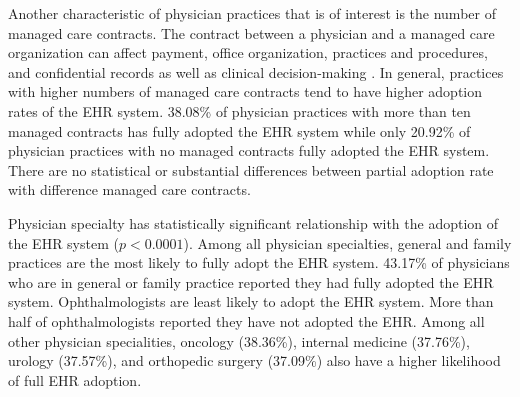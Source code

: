 \documentclass[12pt]{report}
\begin{document}
Another characteristic of physician practices that is of interest is the number of managed care contracts. The contract between a physician and a managed care organization can affect payment, office organization, practices and procedures, and confidential records as well as clinical decision-making \citep{mcc2008}. In general, practices with higher numbers of managed care contracts tend to have higher adoption rates of the EHR system. 38.08\% of physician practices with more than ten managed contracts has fully adopted the EHR system while only 20.92\% of physician practices with no managed contracts fully adopted the EHR system. There are no statistical or substantial differences between partial adoption rate with difference managed care contracts.

Physician specialty has statistically significant relationship with the adoption of the EHR system ($p < 0.0001$). Among all physician specialties, general and family practices are the most likely to fully adopt the EHR system. 43.17\% of physicians who are in general or family practice reported they had fully adopted the EHR system. Ophthalmologists are least likely to adopt the EHR system. More than half of ophthalmologists reported they have not adopted the EHR. Among all other physician specialities, oncology (38.36\%), internal medicine (37.76\%), urology (37.57\%), and orthopedic surgery (37.09\%) also have a higher likelihood of full EHR adoption.
 
\end{document}
